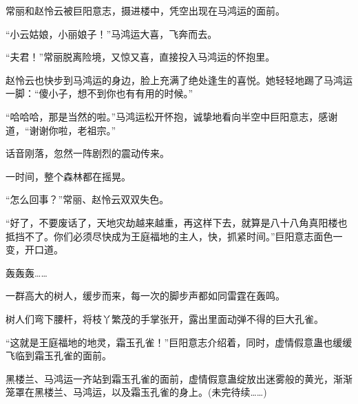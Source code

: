 \begin{this_body}
常丽和赵怜云被巨阳意志，摄进楼中，凭空出现在马鸿运的面前。

“小云姑娘，小丽娘子！”马鸿运大喜，飞奔而去。

“夫君！”常丽脱离险境，又惊又喜，直接投入马鸿运的怀抱里。

赵怜云也快步到马鸿运的身边，脸上充满了绝处逢生的喜悦。她轻轻地踢了马鸿运一脚：“傻小子，想不到你也有有用的时候。”

“哈哈哈，那是当然的啦。”马鸿运松开怀抱，诚挚地看向半空中巨阳意志，感谢道，“谢谢你啦，老祖宗。”

话音刚落，忽然一阵剧烈的震动传来。

一时间，整个森林都在摇晃。

“怎么回事？”常丽、赵怜云双双失色。

“好了，不要废话了，天地灾劫越来越重，再这样下去，就算是八十八角真阳楼也抵挡不了。你们必须尽快成为王庭福地的主人，快，抓紧时间。”巨阳意志面色一变，开口道。

轰轰轰……

一群高大的树人，缓步而来，每一次的脚步声都如同雷霆在轰鸣。

树人们弯下腰杆，将枝丫繁茂的手掌张开，露出里面动弹不得的巨大孔雀。

“这就是王庭福地的地灵，霜玉孔雀！”巨阳意志介绍着，同时，虚情假意蛊也缓缓飞临到霜玉孔雀的面前。

黑楼兰、马鸿运一齐站到霜玉孔雀的面前，虚情假意蛊绽放出迷雾般的黄光，渐渐笼罩在黑楼兰、马鸿运，以及霜玉孔雀的身上。(未完待续……)

\end{this_body}


